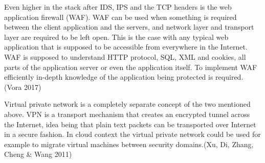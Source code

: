\documentclass{article}
\begin{document}
\par
Even higher in the stack after IDS, IPS and the TCP headers is the web application firewall (WAF). WAF can be used when something is required between the client application and the servers, and network layer and transport layer are required to be left open. This is the case with any typical web application that is supposed to be accessible from everywhere in the Internet. WAF is supposed to understand HTTP protocol, SQL, XML and cookies, all parts of the application server or even the application itself. To implement WAF efficiently in-depth knowledge of the application being protected is required. (Vora 2017)
\par
Virtual private network is a completely separate concept of the two mentioned above. VPN is a transport mechanism that creates an encrypted tunnel across the Internet, idea being that plain text packets can be transported over Internet in a secure fashion. In cloud context the virtual private network could be used for example to migrate virtual machines between security domains.(Xu, Di, Zhang, Cheng \& Wang 2011)
\par
\end{document}
